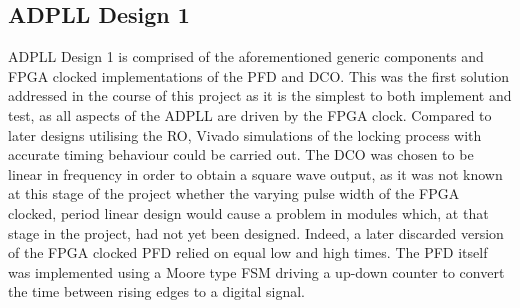 \subsection{\acs{ADPLL} Design 1}
\acs{ADPLL} Design 1 is comprised of the aforementioned generic components and \ac{FPGA} clocked implementations of the \ac{PFD} and \ac{DCO}. This was the first solution addressed in the course of this project as it is the simplest to both implement and test, as all aspects of the \ac{ADPLL} are driven by the \ac{FPGA} clock. Compared to later designs utilising the \ac{RO}, Vivado simulations of the locking process with accurate timing behaviour could be carried out. The \ac{DCO} was chosen to be linear in frequency in order to obtain a square wave output, as it was not known at this stage of the project whether the varying pulse width of the \ac{FPGA} clocked, period linear design would cause a problem in modules which, at that stage in the project, had not yet been designed. Indeed, a later discarded version of the \ac{FPGA} clocked \ac{PFD} relied on equal low and high times. The \ac{PFD} itself was implemented using a Moore type \ac{FSM} driving a up-down counter to convert the time between rising edges to a digital signal.

